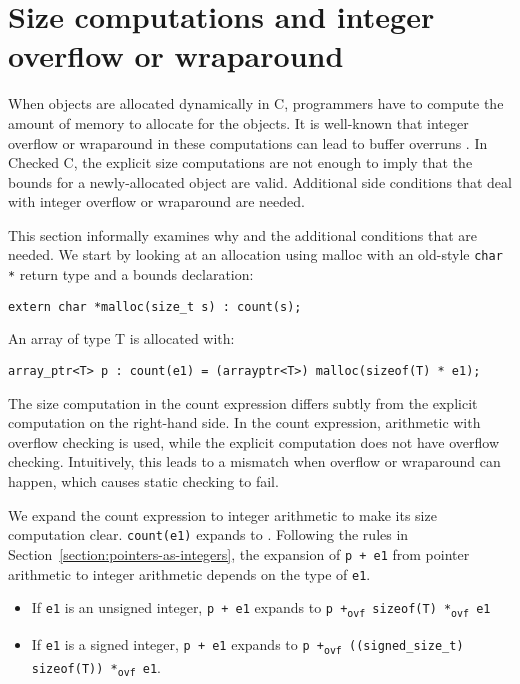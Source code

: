\section{Size computations and integer overflow or wraparound}
\label{section:integer-overflow-informal}

When objects are allocated dynamically in C, programmers have to compute
the amount of memory to allocate for the objects. It is well-known 
that integer overflow or wraparound in these computations can lead to buffer
overruns \cite{Howard2003,Mitre2015-128,Mitre2015-190,Mitre2015-680,Dietz2015}.
 In Checked C, the explicit size computations are not enough
to imply that the bounds for a newly-allocated object are valid.
Additional side conditions that deal with integer overflow or wraparound
are needed.

This section informally examines why and the additional conditions that
are needed. We start by looking at an allocation using malloc with an
old-style \texttt{char *} return type and a bounds declaration:

\begin{verbatim}
extern char *malloc(size_t s) : count(s);
\end{verbatim}

An array of type T is allocated with:

\begin{verbatim}
array_ptr<T> p : count(e1) = (arrayptr<T>) malloc(sizeof(T) * e1);
\end{verbatim}

The size computation in the count expression differs subtly from the
explicit computation on the right-hand side. In the count expression,
arithmetic with overflow checking is used, while the explicit
computation does not have overflow checking. Intuitively, this leads to
a mismatch when overflow or wraparound can happen, which causes static
checking to fail.

We expand the count expression to integer arithmetic to make its size
computation clear. \texttt{count(e1)} expands to . 
Following the rules in Section~\ref{section:pointers-as-integers},
the expansion of \texttt{p +
e1} from pointer arithmetic to integer arithmetic depends on the type of
\texttt{e1}.

\begin{itemize}
\item
  If \texttt{e1} is an unsigned integer, \texttt{p + e1} expands to
  \texttt{p +\textsubscript{ovf} sizeof(T) *\textsubscript{ovf} e1}
\item
  If \texttt{e1} is a signed integer, \texttt{p + e1} expands to
  \texttt{p +\textsubscript{ovf} ((signed\_size\_t) sizeof(T))
  *\textsubscript{ovf} e1}.
\end{itemize}

